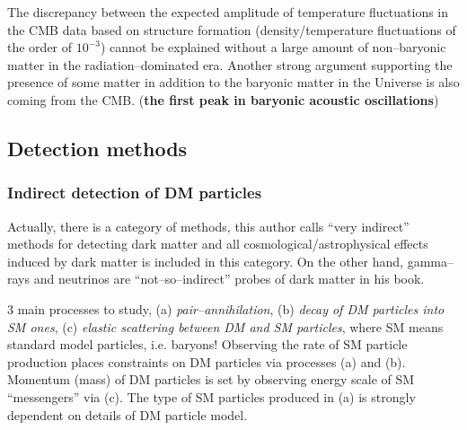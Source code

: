 \documentclass[paper=a4, fontsize=11pt]{scrartcl} %
\numberwithin{equation}{section} %
\numberwithin{figure}{section} %
\numberwithin{table}{section} %
\begin{document}

The discrepancy between the expected amplitude of temperature fluctuations in the CMB data based on structure formation (density/temperature fluctuations of the order of $10^{-3}$) cannot be explained without a large amount of non--baryonic matter in the radiation--dominated era. Another strong argument supporting the presence of some matter in addition to the baryonic matter in the Universe is also coming from the CMB. ({\bf the first peak in baryonic acoustic oscillations})


\subsection{Detection methods}
\subsubsection*{Indirect detection of DM particles}
Actually, there is a category of methods, this author calls ``very indirect'' methods for detecting dark matter and all cosmological/astrophysical effects induced by dark matter is included in this category. On the other hand, gamma--rays and neutrinos are ``not--so--indirect'' probes of dark matter in his book.

3 main processes to study, (a) \emph{pair--annihilation}, (b) \emph{decay of DM particles into SM ones}, (c) \emph{elastic scattering between DM and SM particles}, where SM means standard model particles, i.e. baryons!
Observing the rate of SM particle production places constraints on DM particles via processes (a) and (b).
Momentum (mass) of DM particles is set by observing energy scale of SM ``messengers'' via (c).
The type of SM particles produced in (a) is strongly dependent on details of DM particle model.
\end{document}
